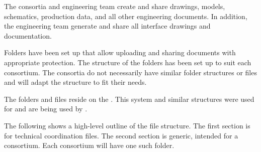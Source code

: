 The consortia and  engineering team create and share drawings, models, schematics, production data, and all other
engineering documents. In addition, the  engineering team generate and share all interface drawings and
documentation.


Folders have been set up that allow uploading and sharing
documents with appropriate protection. The structure of the folders
has been set up to suit each consortium. The
consortia do not necessarily have similar folder structures or files and will adapt
the structure to fit their needs.


The folders and files reside on the . This system and
similar structures were used for  and are being
used by .


The following shows a high-level outline of the file structure. The
first section is for technical coordination files. The second
section is generic, intended for a consortium. Each consortium will have one such
folder.
